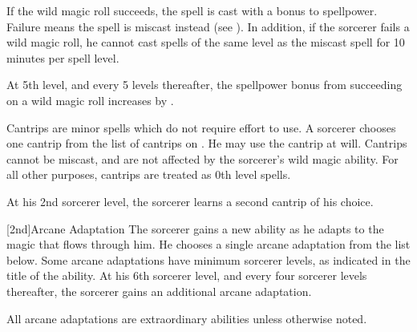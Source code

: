 If the wild magic roll succeeds, the spell is cast with a  bonus to spellpower.
Failure means the spell is miscast instead (see ).
In addition, if the sorcerer fails a wild magic roll, he cannot cast spells of the same level as the miscast spell for 10 minutes per spell level.

At 5th level, and every 5 levels thereafter, the spellpower bonus from succeeding on a wild magic roll increases by .

Cantrips are minor spells which do not require effort to use.
A sorcerer chooses one cantrip from the list of cantrips on .
He may use the cantrip at will.
Cantrips cannot be miscast, and are not affected by the sorcerer's wild magic ability.
For all other purposes, cantrips are treated as 0th level spells.

At his 2nd sorcerer level, the sorcerer learns a second cantrip of his choice.

[2nd]{Arcane Adaptation}
The sorcerer gains a new ability as he adapts to the magic that flows through him.
He chooses a single arcane adaptation from the list below.
Some arcane adaptations have minimum sorcerer levels, as indicated in the title of the ability.
At his 6th sorcerer level, and every four sorcerer levels thereafter, the sorcerer gains an additional arcane adaptation.

All arcane adaptations are extraordinary abilities unless otherwise noted.

